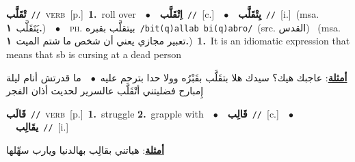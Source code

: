 \documentclass[10pt,a4paper,twoside]{article} %
\begin{document}
\begin{multicols}{2}
{\setlength\topsep{0pt}\textbf{\foreignlanguage{arabic}{تْقَلَّب}}\ {\color{gray}\texttt{//}\color{black}}\ \textsc{verb}\ [p.]\ \textbf{1.}~roll over\ \ $\bullet$\ \ \setlength\topsep{0pt}\textbf{\foreignlanguage{arabic}{اِتْقَلَّب}}\ {\color{gray}\texttt{//}\color{black}}\ [c.]\ \ $\bullet$\ \ \setlength\topsep{0pt}\textbf{\foreignlanguage{arabic}{يِتْقَلَّب}}\ {\color{gray}\texttt{//}\color{black}}\ [i.]\ \color{gray}(msa. \foreignlanguage{arabic}{يَتَقَلَّب}~\foreignlanguage{arabic}{\textbf{١.}})\color{black}\ \ $\bullet$\ \ \textsc{ph.} \color{gray} \foreignlanguage{arabic}{بيتقلَّب بقبره}\color{black}\ {\color{gray}\texttt{/{\sffamily bit(q)allab bi(q)abro}/}\color{black}}\ \color{gray}(src. \foreignlanguage{arabic}{القدس})\color{black}\ \color{gray} (msa. \foreignlanguage{arabic}{تعبير مجازي يعني أن شخص ما شتم الميت}~\foreignlanguage{arabic}{\textbf{١.}})\color{black}\ \textbf{1.}~It is an idiomatic expression that means that sb is cursing at a dead person\  \begin{flushright}\color{gray}\foreignlanguage{arabic}{\textbf{\underline{\foreignlanguage{arabic}{أمثلة}}}: عاجبك هيك؟ سيدك هلا بتقَلَّب بقَبْرُه وولا حدا بترحم عليه\ $\bullet$\ \  ما قدرتش أنام ليلة إِمبارح فضليتني أتْقَلَّب عالسرير لحديت أذان الفجر}\end{flushright}\color{black}} \vspace{2mm}

{\setlength\topsep{0pt}\textbf{\foreignlanguage{arabic}{قَالَب}}\ {\color{gray}\texttt{//}\color{black}}\ \textsc{verb}\ [p.]\ \textbf{1.}~struggle  \textbf{2.}~grapple with\ \ $\bullet$\ \ \setlength\topsep{0pt}\textbf{\foreignlanguage{arabic}{قَالِب}}\ {\color{gray}\texttt{//}\color{black}}\ [c.]\ \ $\bullet$\ \ \setlength\topsep{0pt}\textbf{\foreignlanguage{arabic}{يقَالِب}}\ {\color{gray}\texttt{//}\color{black}}\ [i.]\  \begin{flushright}\color{gray}\foreignlanguage{arabic}{\textbf{\underline{\foreignlanguage{arabic}{أمثلة}}}: هياتني بقالِب بهالدنيا ويارب سهِّلها}\end{flushright}\color{black}} \vspace{2mm}


\end{multicols}
\end{document}
